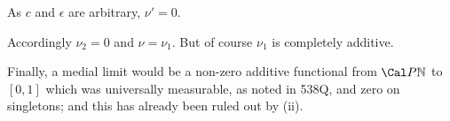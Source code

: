 {

\noindent As $c$ and $\epsilon$ are arbitrary, $\nu'=0$.\ \Qed

Accordingly $\nu_2=0$ and $\nu=\nu_1$.   But of course $\nu_1$ is
completely additive.

\medskip

 Finally, a medial limit would be a non-zero additive
functional from $\Cal P\Bbb N$ to $[0,1]$
which was universally measurable, as noted in
538Q, and zero on singletons;  and this has already been ruled out by (ii).
}%


